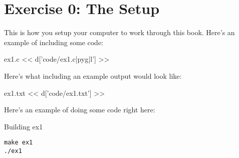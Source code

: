 \chapter{Exercise 0: The Setup}

This is how you setup your computer to work through this book.  Here's an example of including
some code:

\begin{code}{ex1.c}
<< d['code/ex1.c|pyg|l'] >>
\end{code}

Here's what including an example output would look like:

\begin{code}{ex1.txt}
<< d['code/ex1.txt'] >>
\end{code}

Here's an example of doing some code right here:

\begin{code}{Building ex1}
\begin{Verbatim}
make ex1
./ex1
\end{Verbatim}
\end{code}


